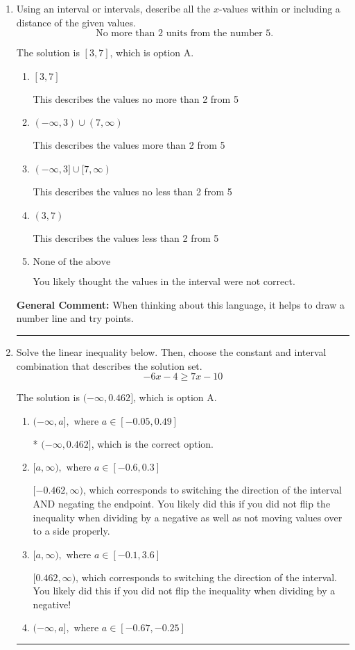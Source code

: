 \documentclass{extbook}[14pt]
\newcommand{\litem}[1]{\item #1

\rule{\textwidth}{0.4pt}}
\begin{document}
\begin{enumerate}\litem{
Using an interval or intervals, describe all the $x$-values within or including a distance of the given values.
\[ \text{ No more than } 2 \text{ units from the number } 5. \]

The solution is \( [3, 7] \), which is option A.\begin{enumerate}[label=\Alph*.]
\item \( [3, 7] \)

This describes the values no more than 2 from 5
\item \( (-\infty, 3) \cup (7, \infty) \)

This describes the values more than 2 from 5
\item \( (-\infty, 3] \cup [7, \infty) \)

This describes the values no less than 2 from 5
\item \( (3, 7) \)

This describes the values less than 2 from 5
\item \( \text{None of the above} \)

You likely thought the values in the interval were not correct.
\end{enumerate}

\textbf{General Comment:} When thinking about this language, it helps to draw a number line and try points.
}
\litem{
Solve the linear inequality below. Then, choose the constant and interval combination that describes the solution set.
\[ -6x -4 \geq 7x -10 \]

The solution is \( (-\infty, 0.462] \), which is option A.\begin{enumerate}[label=\Alph*.]
\item \( (-\infty, a], \text{ where } a \in [-0.05, 0.49] \)

* $(-\infty, 0.462]$, which is the correct option.
\item \( [a, \infty), \text{ where } a \in [-0.6, 0.3] \)

 $[-0.462, \infty)$, which corresponds to switching the direction of the interval AND negating the endpoint. You likely did this if you did not flip the inequality when dividing by a negative as well as not moving values over to a side properly.
\item \( [a, \infty), \text{ where } a \in [-0.1, 3.6] \)

 $[0.462, \infty)$, which corresponds to switching the direction of the interval. You likely did this if you did not flip the inequality when dividing by a negative!
\item \( (-\infty, a], \text{ where } a \in [-0.67, -0.25] \)


\end{enumerate}}
\end{enumerate}
\end{document}

